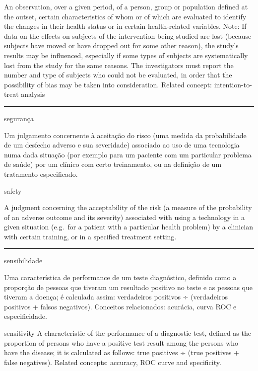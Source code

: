 \documentclass[
]{book}
\begin{document}
An observation, over a given period, of a person, group or population defined at the outset, certain characteristics of whom or of which are evaluated to identify the changes in their health status or in certain health-related variables. Note: If data on the effects on subjects of the intervention being studied are lost (because subjects have moved or have dropped out for some other reason), the study's results may be influenced, especially if some types of subjects are systematically lost from the study for the same reasons. The investigators must report the number and type of subjects who could not be evaluated, in order that the possibility of bias may be taken into consideration. Related concept: intention-to-treat analysis

\begin{center}\rule{0.5\linewidth}{0.5pt}\end{center}

segurança

Um julgamento concernente à aceitação do risco (uma medida da probabilidade de um desfecho adverso e sua severidade) associado ao uso de uma tecnologia numa dada situação (por exemplo para um paciente com um particular problema de saúde) por um clínico com certo treinamento, ou na definição de um tratamento especificado.

safety

A judgment concerning the acceptability of the risk (a measure of the probability of an adverse outcome and its severity) associated with using a technology in a given situation (e.g.~for a patient with a particular health problem) by a clinician with certain training, or in a specified treatment setting.

\begin{center}\rule{0.5\linewidth}{0.5pt}\end{center}

sensibilidade

Uma característica de performance de um teste diagnóstico, definido como a proporção de pessoas que tiveram um resultado positivo no teste e as pessoas que tiveram a doença; é calculada assim: verdadeiros positivos ÷ (verdadeiros positivos + falsos negativos). Conceitos relacionados: acurácia, curva ROC e especificidade.

sensitivity
A characteristic of the performance of a diagnostic test, defined as the proportion of persons who have a positive test result among the persons who have the disease; it is calculated as follows: true positives ÷ (true positives + false negatives). Related concepts: accuracy, ROC curve and specificity.
\end{document}
